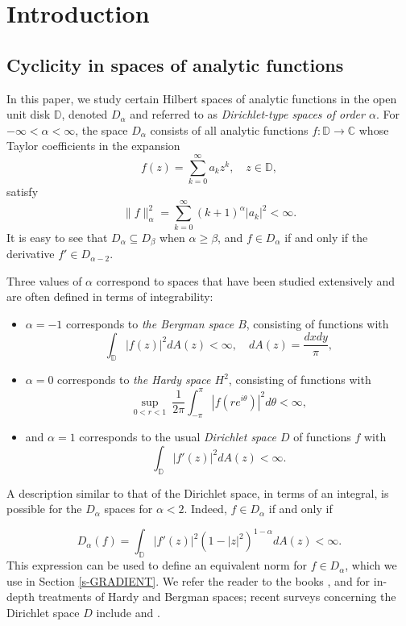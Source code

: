 \documentclass[11 pt,reqno]{amsart}
\theoremstyle{definition}
\theoremstyle{remark}
\numberwithin{equation}{section} \numberwithin{figure}{section}
\newcommand{\CC}{{\mathbb C}}
\newcommand{\DD}{{\mathbb D}}
\begin{document}

\section{Introduction}
\subsection{Cyclicity in spaces of analytic functions}
In this paper, we study certain Hilbert spaces of analytic functions in the open unit disk
$\DD$, denoted $D_{\alpha}$ and referred to as \emph{Dirichlet-type
spaces of order $\alpha$}.  For $-\infty<\alpha<\infty$, the space $D_{\alpha}$ consists of
all analytic functions $f\colon\DD\rightarrow \CC$ whose Taylor coefficients in the expansion
\[f(z)=\sum_{k=0}^{\infty}a_kz^k, \quad z \in \DD,\]
satisfy
\begin{equation*}
\|f\|^2_\alpha=\sum_{k=0}^\infty (k+1)^{\alpha}|a_k|^2< \infty.
\end{equation*}
It is easy to see that $D_{\alpha}\subseteq D_{\beta}$ when $\alpha\geq\beta$, and
$f\in D_{\alpha}$ if and only if the derivative $f'\in D_{\alpha-2}$.

Three values of $\alpha$ correspond to spaces that have been studied
extensively and are often defined in terms of integrability:
\begin{itemize}
\item $\alpha=-1$ corresponds to {\it the Bergman space $B$}, consisting of
functions with
\[\int_{\DD}|f(z)|^2dA(z)<\infty, \quad dA(z)=\frac{dxdy}{\pi},\]
\item $\alpha=0$ corresponds to {\it the Hardy space $H^2$}, consisting of functions
with
\[\sup_{0<r<1}\ \frac{1}{2\pi}\int_{-\pi}^{\pi}|f(re^{i\theta})|^2d\theta<\infty,\]
\item and $\alpha=1$ corresponds to the usual {\it Dirichlet space $D$}
of functions $f$ with
\[\int_{\DD}|f'(z)|^2dA(z)<\infty.\]
\end{itemize}
A description similar to that of the Dirichlet space, in terms of an
integral, is possible for the $D_\alpha$ spaces for $\alpha < 2.$
Indeed, $f \in D_{\alpha}$ if and only if

\begin{equation}\label{dalfaf}
D_\alpha (f)= \int_{\DD} |f'(z)|^2 ( 1 - |z|^2)^{1 - \alpha} dA(z) <
\infty.
\end{equation}
This expression can be used to define an equivalent norm for $f \in D_{\alpha}$,
which we use in Section \ref{s-GRADIENT}. We refer the reader to the books
\cite{Durbook}, \cite{DS04} and \cite{HKZ00} for in-depth treatments of Hardy
and Bergman spaces; recent surveys concerning the Dirichlet space $D$ include
\cite{ARSW11} and \cite{Ross06}.
\end{document}
